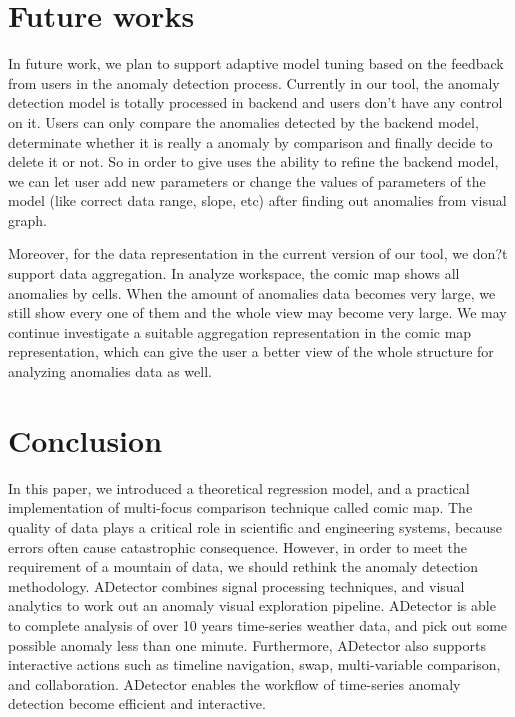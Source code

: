 \documentclass{vgtc}                          %
\begin{document}
\section{Future works}

In future work, we plan to support adaptive model tuning based on the feedback from users in the anomaly detection process. Currently in our tool, the anomaly detection model is totally processed in backend and users don't have any control on it. Users can only compare the anomalies detected by the backend model, determinate whether it is really a anomaly by comparison and finally decide to delete it or not. So in order to give uses the ability to refine the backend model, we can let user add new parameters or change the values of parameters of the model (like correct data range, slope, etc) after finding out anomalies from visual graph.

Moreover, for the data representation in the current version of our tool, we don?t support data aggregation. In analyze workspace, the comic map shows all anomalies by cells. When the amount of anomalies data becomes very large, we still show every one of them and the whole view may become very large. We may continue investigate a suitable aggregation representation in the comic map representation, which can give the user a better view of the whole structure for analyzing anomalies data as well.  
\section{Conclusion}

In this paper, we introduced a theoretical regression model, and a practical implementation of multi-focus comparison technique called comic map. The quality of data plays a critical role in scientific and engineering systems, because errors often cause catastrophic consequence. However, in order to meet the requirement of a mountain of data, we should rethink the anomaly detection methodology. ADetector combines signal processing techniques, and visual analytics to work out an anomaly visual exploration pipeline. ADetector is able to complete analysis of over 10 years time-series weather data, and pick out some possible anomaly less than one minute. Furthermore, ADetector also supports interactive actions such as timeline navigation, swap, multi-variable comparison, and collaboration. ADetector enables the workflow of time-series anomaly detection become efficient and interactive.





\end{document}
